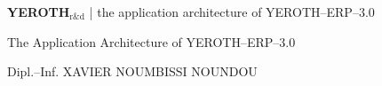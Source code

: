 \documentclass[a4paper, 10pt]{article}
\newcommand{\yerothrd}{\textcolor{yerothColorGreen}
			{\textsc{\textcolor{yerothColorRed}{YEROTH}}$_{\text{r\&d}}$\xspace}}
\newcommand{\yerotherpblack}{YEROTH--ERP--$3.0$\xspace}
\newcommand{\myfullacademicname}{Dipl.--Inf. XAVIER NOUMBISSI NOUNDOU\xspace}
\begin{document}
\thispagestyle{OnlyFirstPage}

{\bf \Large \yerothrd} {| \sc \scriptsize the application architecture of \yerotherpblack}

\vspace{2.0em}

\begin{center}
{\LARGE The Application Architecture of \yerotherpblack}
\end{center}

\vspace{2.0em}

\begin{center}
{\large \myfullacademicname}
\end{center}

\vspace{2.0em}



\vspace{5em}

{}
\begingroup
\tableofcontents
\endgroup

\newpage
\end{document}
